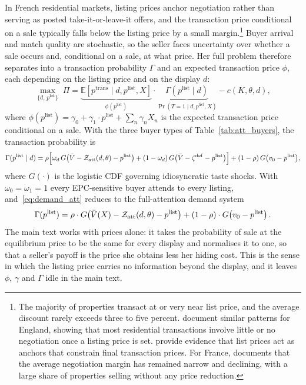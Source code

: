 In French residential markets, listing prices anchor negotiation rather than serving as posted take-it-or-leave-it offers, and the transaction price conditional on a sale typically falls below the listing price by a small margin.\footnote{The majority of properties transact at or very near list price, and the average discount rarely exceeds three to five percent. \citet{merlo_bargaining_2004} document similar patterns for England, showing that most residential transactions involve little or no negotiation once a listing price is set. \citet{genesove_loss_2001} provide evidence that list prices act as anchors that constrain final transaction prices. For France, \citet{friggit_marche_2013} documents that the average negotiation margin has remained narrow and declining, with a large share of properties selling without any price reduction.} Buyer arrival and match quality are stochastic, so the seller faces uncertainty over whether a sale occurs and, conditional on a sale, at what price. Her full problem therefore separates into a transaction probability $\Gamma$ and an expected transaction price $\phi$, each depending on the listing price and on the display $d$:
\begin{equation}
    \max_{\{d,\,p^{\text{list}}\}} \;\Pi = \underbrace{\mathbb{E}\!\left[p^{\text{trans}}\mid d,p^{\text{list}},X\right]}_{\phi(p^{\text{list}})} \cdot \underbrace{\Gamma(p^{\text{list}}\mid d)}_{\Pr(T=1\mid d,p^{\text{list}},X)} - c(K,\theta,d),
    \label{eq:payoff}
\end{equation}
where $\phi(p^{\text{list}}) = \gamma_0+\gamma_1 \cdot p^{\text{list}}+\sum_n\gamma_n X_n$ is the expected transaction price conditional on a sale. With the three buyer types of Table~\ref{tab:att_buyers}, the transaction probability is
\begin{equation}
    \Gamma(p^{\rm list}\mid d)=\rho\Big[\omega_d\,G\big(\bar V-\mathcal Z_{\rm att}(d,\theta)-p^{\rm list}\big)+(1-\omega_d)\,G\big(\bar V-\zeta^{\rm def}-p^{\rm list}\big)\Big]+(1-\rho)\,G\big(v_0-p^{\rm list}\big),
    \label{eq:demand_att}
\end{equation}
where $G(\cdot)$ is the logistic CDF governing idiosyncratic taste shocks. With $\omega_0=\omega_1=1$ every EPC-sensitive buyer attends to every listing, and~\eqref{eq:demand_att} reduces to the full-attention demand system
\begin{equation}
    \Gamma(p^{\text{list}}) = \rho\cdot G\!\left(\bar V(X)-\mathcal Z_{\rm att}(d,\theta)-p^{\text{list}}\right) + (1-\rho)\cdot G\!\left(v_0-p^{\text{list}}\right).
    \label{eq:demand}
\end{equation}
The main text works with prices alone: it takes the probability of sale at the equilibrium price to be the same for every display and normalises it to one, so that a seller's payoff is the price she obtains less her hiding cost. This is the sense in which the listing price carries no information beyond the display, and it leaves $\phi$, $\gamma$ and $\Gamma$ idle in the main text.

